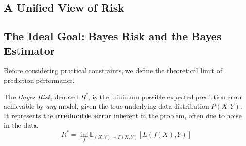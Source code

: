 \begin{notechapter}
\forgetcs\risk\newcommand{\risk}[1]{R(#1)}
\forgetcs\emprisk\newcommand{\emprisk}[1]{\hat{R}(#1)}
\forgetcs\bayesrisk\newcommand{\bayesrisk}{R^{*}}
\forgetcs\bayesestimator\newcommand{\bayesestimator}{f_{\text{Bayes}}}
\forgetcs\hypclass\newcommand{\hypclass}{\mathcal{H}}
\forgetcs\bestinclass\newcommand{\bestinclass}{f_{\hypclass}^{*}}
\forgetcs\expect\newcommand{\expect}{\mathbb{E}}
\forgetcs\indicator\newcommand{\indicator}{\mathbb{I}}
\chapter{A Unified View of Risk}\label{ch:generalization-risk}

\begin{abstract}
    The primary goal of supervised machine learning is to build models that perform well on new, unseen data. This document presents a unified framework for quantifying and understanding this goal through the lens of \emph{risk}. We define key concepts—\textbf{Generalization Risk}, \textbf{Bayes Risk}, and the \textbf{Bayes Estimator}—and decompose the total error into interpretable components: \textbf{Approximation Risk} and \textbf{Estimation Risk}. This decomposition provides a powerful theoretical foundation for understanding fundamental trade-offs, such as bias-variance and overfitting-underfitting.
\end{abstract}

\section{The Ideal Goal: Bayes Risk and the Bayes Estimator}
\label{generalization-risk:sec:bayes}

Before considering practical constraints, we define the theoretical limit of prediction performance.

\begin{definition}
    The \emph{Bayes Risk}, denoted \(\bayesrisk\), is the minimum possible expected prediction error achievable by \emph{any} model, given the true underlying data distribution \( P(X, Y) \). It represents the \textbf{irreducible error} inherent in the problem, often due to noise in the data.
    \[
    \bayesrisk = \inf_{f} \expect_{(X,Y)\sim P(X,Y)}[L(f(X), Y)]
    \]
\end{definition}


\end{notechapter}
